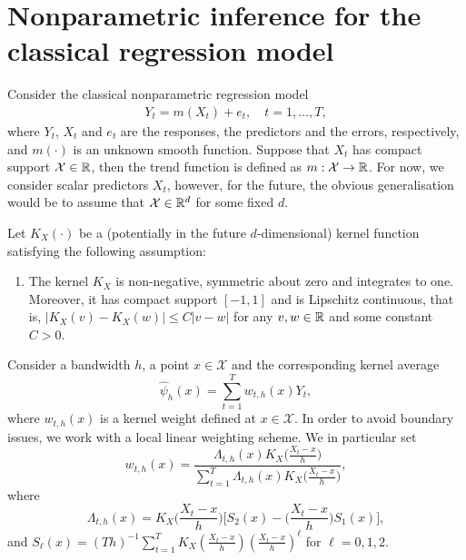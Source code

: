 \documentclass[a4paper,12pt]{article}
\begin{document}
\section{Nonparametric inference for the classical regression model}

Consider the classical nonparametric regression model
\begin{align}\label{model}
Y_t = m(X_t) + e_t, \quad t = 1,\ldots, T,
\end{align}
where $Y_t$, $X_t$ and $e_t$ are the responses, the predictors and the errors, respectively, and $m(\cdot)$ is an unknown smooth function. Suppose that $X_t$ has compact support $\mathcal{X}\in \mathbb{R}$, then the trend function is defined as $m: \mathcal{X} \rightarrow \mathbb{R}$. For now, we consider scalar predictors $X_t$, however, for the future, the obvious generalisation would be to assume that $\mathcal{X} \in \mathbb{R}^d$ for some fixed $d$.

Let $K_X(\cdot)$ be a (potentially in the future $d$-dimensional) kernel function satisfying the following assumption:
\begin{enumerate}[label=(C\arabic*),leftmargin=1.05cm]
\item \label{C-kerX} The kernel $K_X$ is non-negative, symmetric about zero and integrates to one. Moreover, it has compact support $[-1,1]$ and is Lipschitz continuous, that is, $|K_X(v) - K_X(w)| \le C |v-w|$ for any $v,w \in \mathbb{R}$ and some constant $C > 0$. 
\end{enumerate} 

Consider a bandwidth $h$, a point $x \in \mathcal{X}$ and the corresponding kernel average
\begin{equation*}
\widehat{\psi}_{h}(x) = \sum\limits_{t=1}^T w_{t, h}(x)  Y_{t}, 
\end{equation*}
where $w_{t, h}(x)$ is a kernel weight defined at $x \in \mathcal{X}$. In order to avoid boundary issues, we work with a local linear weighting scheme. We in particular set 
\begin{equation}\label{weights}
w_{t, h}(x) = \frac{\Lambda_{t,h}(x)K_X\big(\frac{X_t-x}{h}\big) }{\sum\nolimits_{t=1}^T \Lambda_{t,h}(x) K_X\big(\frac{X_t-x}{h}\big)  }, 
\end{equation}
where
\[ \Lambda_{t,h}(x) = K_X\Big(\frac{X_t-x}{h}\Big) \bigg[ S_{2}(x) - \Big(\frac{X_t-x}{h}\Big) S_{1}(x) \bigg], \]
and $S_{\ell}(x) = (Th)^{-1} \sum\nolimits_{t=1}^T K_X(\frac{X_t-x}{h}) (\frac{X_t-x}{h})^\ell$ for $\ell = 0,1,2$.
\end{document}
